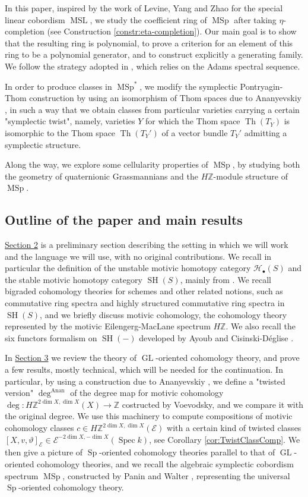 \documentclass[10pt]{amsart}
\theoremstyle{definition}
\theoremstyle{plain}
\numberwithin{equation}{section}
\newcommand{\0}{\emptyset}
\newcommand{\sE}{{\mathcal E}}
\newcommand{\sH}{{\mathcal H}}
\newcommand{\Z}{{\mathbb Z}}
\newcommand{\MSL}{{\operatorname{MSL}}}
\newcommand{\MSp}{{\operatorname{MSp}}}
\newcommand{\GL}{{\operatorname{GL}}}
\newcommand{\Sp}{{\operatorname{Sp}}}
\newcommand{\Spec}{{\operatorname{Spec}}}
\newcommand{\SH}{{\operatorname{SH}}}
\newcommand{\Th}{{\operatorname{Th}}}
\renewcommand{\deg}{{\operatorname{deg}}}
\renewcommand{\dim}{{\operatorname{dim}}}
\newcommand{\Anan}{{\operatorname{Anan}}}
\begin{document}
In this paper, inspired by the work of Levine, Yang and Zhao \cite{lev:ellcoh} for the special linear cobordism $\MSL$, we study the coefficient ring of $\MSp$ after taking $\eta$-completion (see Construction \ref{constr:eta-completion}). Our main goal is to show that the resulting ring is polynomial, to prove a criterion for an element of this ring to be a polynomial generator, and to construct explicitly a generating family. We follow the strategy adopted in \cite{lev:ellcoh}, which relies on the Adams spectral sequence.

 In order to produce classes in $\MSp^*$, we modify the symplectic Pontryagin-Thom construction by using an isomorphism of Thom spaces due to Ananyevskiy \cite[Lemma 4.1]{Ana:Slor}, in such a way that we obtain classes from particular varieties carrying a certain "symplectic twist", namely, varieties $Y$ for which the Thom space $\Th(T_Y)$ is isomorphic to the Thom space $\Th(T_Y')$ of a vector bundle $T_Y'$ admitting a symplectic structure.  

 Along the way, we explore some cellularity properties of $\MSp$, by studying both the geometry of quaternionic Grassmannians and the $H\Z$-module structure of $\MSp$.

\subsection*{Outline of the paper and main results}

\underline{Section 2} is a preliminary section describing the setting in which we will work and the language we will use, with no original contributions. We recall in particular the definition of the unstable motivic homotopy category $\sH_\bullet(S)$ and the stable motivic homotopy category $\SH(S)$, mainly from \cite{voe:homotopy_theory}. We recall bigraded cohomology theories for schemes and other related notions, such as commutative ring spectra and highly structured commutative ring spectra in $\SH(S)$, and we briefly discuss motivic cohomology, the cohomology theory represented by the motivic Eilengerg-MacLane spectrum $H\Z$. We also recall the six functors formalism on $\SH(-)$ developed by Ayoub \cite{ayoub:sixfunctors} and Cisinski-Déglise \cite{deglise:mixmot}.

In \underline{Section 3} we review the theory of $\GL$-oriented cohomology theory, and prove a few results, mostly technical, which will be needed for the continuation. In particular, by using a construction due to Ananyevskiy \cite[Lemma 4.1]{Ana:Slor}, we define a "twisted version" $\deg^\Anan$ of the degree map for motivic cohomology $\deg:H\Z^{2\dim X,\dim X}(X) \to \Z$ costructed by Voevodsky, and we compare it with the original degree. We use this machinery to compute compositions of motivic cohomology classes $c \in H\Z^{2 \dim X, \dim X}(\sE)$ with a certain kind of twisted classes $[X,v,\vartheta]_\sE \in \sE^{-2\dim X,-\dim X}(\Spec k)$, see Corollary \ref{cor:TwistClassComp}. We then give a picture of $\Sp$-oriented cohomology theories parallel to that of $\GL$-oriented cohomology theories, and we recall the algebraic symplectic cobordism spectrum $\MSp$, constructed by Panin and Walter \cite{Panwal-cobordism}, representing the universal $\Sp$-oriented cohomology theory.
\end{document}
